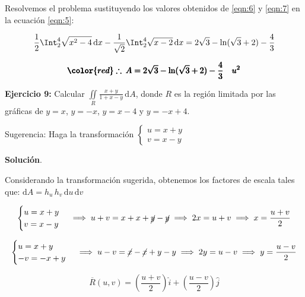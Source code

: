 \documentclass[12pt]{article}
\begin{document}
\noindent Resolvemos el problema sustituyendo los valores obtenidos de \eqref{eqn:6} y \eqref{eqn:7} en la ecuación \eqref{eqn:5}:

\begin{align}
	\frac{1}{2} \Int_2^4 \sqrt{x^2-4}\, \mathrm{d}x - \frac{1}{\sqrt{2}} \Int_2^4 \sqrt{x-2}\, \mathrm{d}x = 2\sqrt{3} - \ln(\sqrt{3}+2) - \frac{4}{3}
\end{align}

\begin{align*}
	 \pmb{\color{red} \therefore\: A = 2\sqrt{3} - \ln(\sqrt{3}+2) - \frac{4}{3}\quad u^2}
\end{align*}

\noindent \textbf{Ejercicio 9:} Calcular $\iint\limits_R \frac{x+y}{1+x-y}\, \mathrm{d}A$, donde $R$ es la región limitada por las gráficas de $y=x$, $y=-x$, $y=x-4$ y $y=-x+4$.

\vspace{3mm}

\noindent Sugerencia: Haga la transformación $\begin{cases} u = x+y\\v=x-y\end{cases}$

\noindent \textbf{Solución}.

\vspace{3mm}

\noindent Considerando la transformación sugerida, obtenemos los factores de escala tales que: $\mathrm{d}A = h_u\,h_v\,\mathrm{d}u\,\mathrm{d}v$

\begin{align*}
	\begin{cases}
		u = x+y\\
		v=x-y
	\end{cases} \implies u+v=x+x+\cancel{y}-\cancel{y} \implies 2x = u+v \implies x = \frac{u+v}{2}
\end{align*}

\begin{align*}
	\begin{cases}
		u = x+y\\
		-v = -x+y
	\end{cases} \implies u-v=\cancel{x}-\cancel{x}+y-y \implies 2y = u-v \implies y = \frac{u-v}{2}
\end{align*}

\begin{equation}\label{eqn:9-1}\tag{1}
	\overline{R}(u,v)=\left(\frac{u+v}{2}\right)\hat{i} + (\frac{u-v}{2})\hat{j}
\end{equation}
\end{document}
